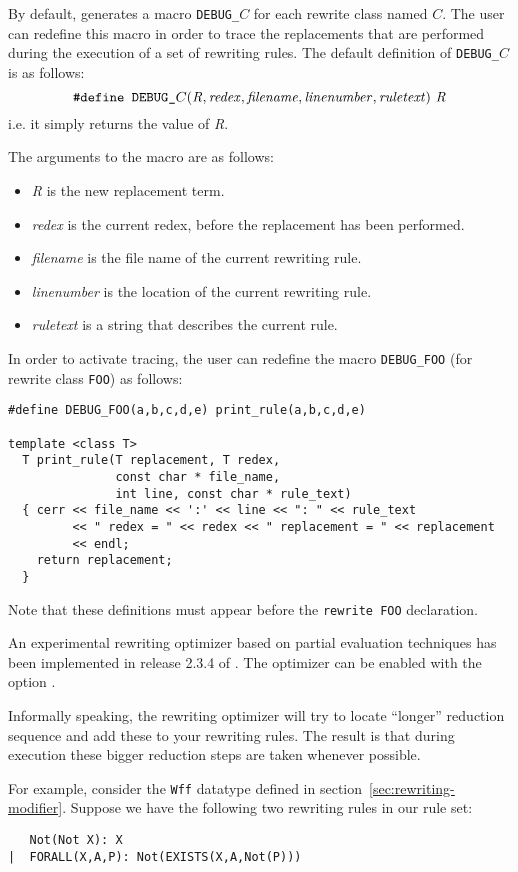   By default, \Prop{} generates a macro \verb|DEBUG_|$C$ for each
rewrite class named $C$.  The user can redefine this macro in order to
trace the replacements that are performed during the execution of a 
set of rewriting rules.  The default definition of \verb|DEBUG_|$C$
is as follows:
\[
\verb|#define DEBUG_|C({\it R,redex,filename,linenumber,ruletext})\ {\it R}
\]
i.e. it simply returns the value of {\it R}.

The arguments to the macro are as follows: 
\begin{itemize} 
\item {\it R} is the new replacement term.
\item {\it redex} is the current redex, before the replacement has been
performed.
\item {\it filename} is the file name of the current rewriting rule.
\item {\it linenumber}  is the location of the current rewriting rule.
\item {\it ruletext} is a string that describes the current rule.
\end{itemize}

In order to activate tracing, the user can redefine the macro
\verb|DEBUG_FOO| (for rewrite class \verb|FOO|) as follows:
\begin{verbatim}
#define DEBUG_FOO(a,b,c,d,e) print_rule(a,b,c,d,e)

template <class T>
  T print_rule(T replacement, T redex, 
               const char * file_name, 
               int line, const char * rule_text)
  { cerr << file_name << ':' << line << ": " << rule_text 
         << " redex = " << redex << " replacement = " << replacement
         << endl;
    return replacement; 
  }
\end{verbatim}
Note that these definitions must appear
before the \verb|rewrite FOO| declaration.

 \label{sec:optimize-rewriting}

   An experimental rewriting optimizer based on partial evaluation
techniques has been implemented in release 2.3.4 of \Prop.  The optimizer
can be enabled with the option .  

Informally speaking, the rewriting optimizer will try to locate 
``longer'' reduction sequence and add these to your rewriting rules.  
The result is that during execution these bigger reduction steps are
taken whenever possible.

   For example, consider the \verb|Wff| datatype defined
in section~\ref{sec:rewriting-modifier}.  Suppose we have the following
two rewriting rules in our rule set:
\begin{verbatim}
   Not(Not X): X
|  FORALL(X,A,P): Not(EXISTS(X,A,Not(P)))
\end{verbatim}

